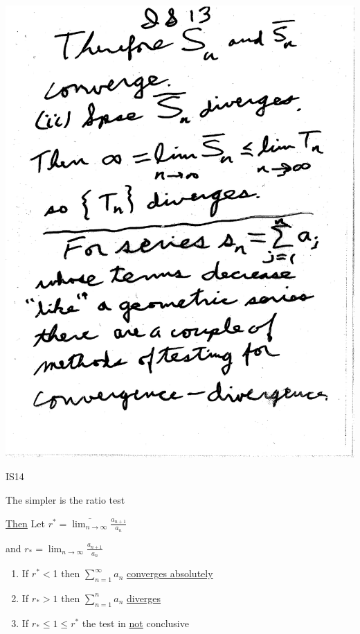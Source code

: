 \documentclass[10pt,a4paper]{article}
\begin{document}
\includegraphics[scale=.5]{Pages/IS_13}

\newpage

\begin{center}
IS14
\end{center}

The simpler is the ratio test

\underline{Then} 
Let $r^* = \bar{\lim_{n\to\infty}} \frac{a_{n+1}}{a_n}$ 

and $r_* =\lim_{n\to\infty} \frac{a_{n+1}}{a_n}$

\begin{enumerate}[i]

\item If $r^*<$1 then $\sum_{n=1}^{\infty}a_n$ \underline{converges absolutely}

\item If $r_* >1$ then $\sum_{n=1}^{n}a_n$ \underline{diverges}

\item If $r_* \le 1 \le r^*$ the test in \underline{not} conclusive

\end{enumerate}
\end{document}
